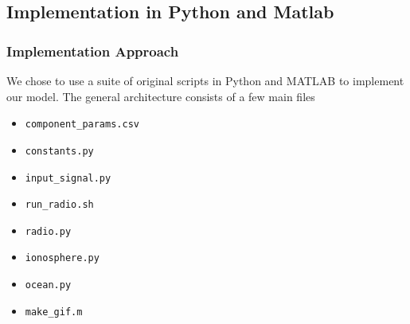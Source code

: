 \documentclass[11pt]{article}
\numberwithin{equation}{section}
\begin{document}


\subsection{Implementation in Python and Matlab}
\label{sub:implementation}

\subsubsection{Implementation Approach}
We chose to use a suite of original scripts in Python and MATLAB to implement our model. The general architecture consists of a few main files
\begin{itemize}
\item \verb|component_params.csv|
\item \verb|constants.py|
\item \verb|input_signal.py|
\item \verb|run_radio.sh|
\item \verb|radio.py|
\item \verb|ionosphere.py|
\item \verb|ocean.py|
\item \verb|make_gif.m|
\end{itemize}
\end{document}
